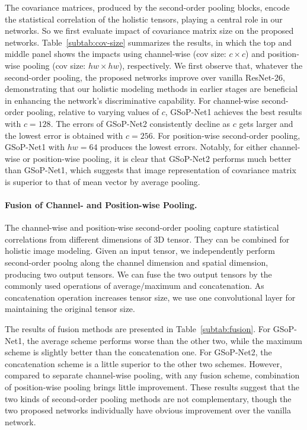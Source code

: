 \documentclass[10pt,twocolumn,letterpaper]{article}
\begin{document}
The covariance matrices, produced by the second-order pooling blocks, encode the statistical correlation of the holistic tensors, playing a central role in our networks. So we first evaluate impact of covariance matrix size on the proposed  networks.  Table~\ref{subtab:cov-size} summarizes the  results, in which the top and middle panel shows the impacts using channel-wise (cov size: $c\times c$)  and position-wise pooling (cov size: $hw\times hw$), respectively.  We first observe that, whatever the second-order pooling, the proposed networks improve over vanilla  ResNet-26, demonstrating that  our holistic modeling methods in earlier stages are beneficial  in enhancing the network's discriminative capability.  For channel-wise second-order pooling, relative to varying values of $c$,  GSoP-Net1 achieves the best results with $c=128$. The errors of GSoP-Net2 consistently decline as $c$ gets larger and the lowest error is obtained with $c=256$. For position-wise second-order pooling,  GSoP-Net1 with $hw=64$ produces the lowest errors.   Notably, for either channel-wise or position-wise  pooling, it is clear that GSoP-Net2 performs much better than GSoP-Net1, which suggests that image representation of covariance matrix is superior to that of mean vector by average pooling.



\paragraph{Fusion of Channel- and Position-wise  Pooling.}

The channel-wise  and position-wise second-order pooling capture statistical correlations from different dimensions of 3D tensor. They can be combined for holistic image modeling. Given an input tensor, we  independently perform second-order poolng along the channel dimension and spatial dimension, producing two output tensors. We can fuse the two output tensors by the commonly used operations of average$/$maximum  and concatenation. As concatenation operation increases tensor size, we use one convolutional layer for maintaining the original tensor size.

The  results of fusion methods are presented in Table~\ref{subtab:fusion}. For GSoP-Net1, the average scheme performs worse than the other two, while the maximum scheme is slightly better than the concatenation one. For GSoP-Net2, the concatenation scheme is a little superior to the other two schemes. However, compared to separate channel-wise  pooling,  with any fusion scheme, combination of position-wise pooling  brings little improvement. These results suggest that the two kinds of  second-order pooling methods are not complementary, though the two proposed networks individually have  obvious improvement over the vanilla network. 
\end{document}
